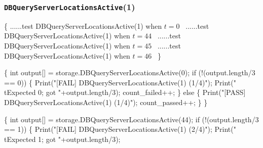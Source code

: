 \documentclass{article}
\def\nwendcode{\endtrivlist \endgroup}
\let\nwdocspar=\par
\theoremstyle{definition}
\begin{document}
\subsubsection{{\tt{}DBQueryServerLocationsActive}(1)}
\nwenddocs{}\endmoddef{}
\{
  \LA{}......test \code{}DBQueryServerLocationsActive\edoc{}(1) when $t=0$~{\nwtagstyle{}}\RA{}
  \LA{}......test \code{}DBQueryServerLocationsActive\edoc{}(1) when $t=44$~{\nwtagstyle{}}\RA{}
  \LA{}......test \code{}DBQueryServerLocationsActive\edoc{}(1) when $t=45$~{\nwtagstyle{}}\RA{}
  \LA{}......test \code{}DBQueryServerLocationsActive\edoc{}(1) when $t=46$~{\nwtagstyle{}}\RA{}
\}
\nwendcode{}\nwdocspar
\nwenddocs{}\endmoddef{}
\{
  int output[] = storage.DBQueryServerLocationsActive(0);
  if (!(output.length/3 == 0)) \{
    Print("[FAIL] DBQueryServerLocationsActive(1) (1/4)");
    Print("\\tExpected 0; got "+output.length/3);
    count_failed++;
  \} else \{
    Print("[PASS] DBQueryServerLocationsActive(1) (1/4)");
    count_passed++;
  \}
\}
\nwendcode{}\nwdocspar
\nwenddocs{}\endmoddef{}
\{
  int output[] = storage.DBQueryServerLocationsActive(44);
  if (!(output.length/3 == 1)) \{
    Print("[FAIL] DBQueryServerLocationsActive(1) (2/4)");
    Print("\\tExpected 1; got "+output.length/3);
\end{document}
